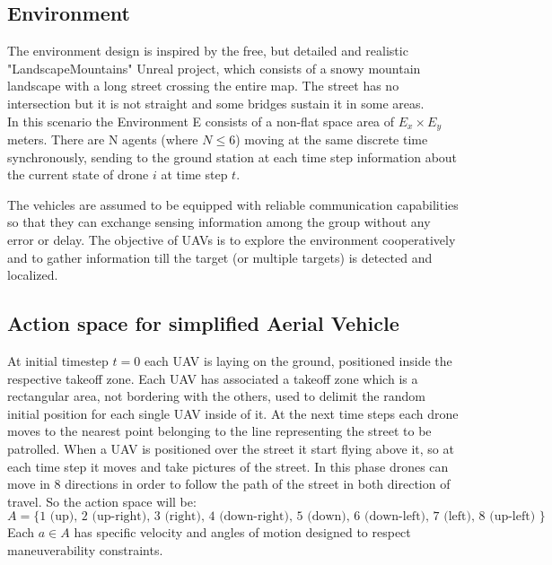 \documentclass[LaM,binding=0.6cm]{sapthesis}
\begin{document}
\subsection*{Environment}
The environment design is inspired by the free, but detailed and realistic "LandscapeMountains" Unreal project, which consists of a snowy mountain landscape with a long street crossing the entire map. The street has no intersection but it is not straight and some bridges sustain it in some areas.\\

In this scenario the Environment E consists of a non-flat space area of $E_x \times E_y$ meters. There are N agents (where $N\le6$) moving at the same discrete time synchronously, sending to the ground station at each time step information about the current state of drone $i$ at time step $t$.


 The vehicles are assumed to be equipped with reliable
communication capabilities so that they can exchange sensing information among the group without any error or delay.
The objective of UAVs is to explore the environment cooperatively and to gather information till the target (or multiple targets) is detected and localized.

\subsection*{Action space for simplified Aerial Vehicle}
At initial timestep $t=0$ each UAV is laying on the ground, positioned inside the respective takeoff zone. Each UAV has associated a takeoff zone which is a rectangular area, not bordering with the others, used to delimit the random initial position for each single UAV inside of it.
At the next time steps each drone moves to the nearest point belonging to the line representing the street to be patrolled.
When a UAV is positioned over the street it start flying above it, so at each time step it moves and take pictures of the street. In this phase drones can move in 8 directions in order to follow the path of the street in both direction of travel. So the action space will be: 
$$ A = \{ 1 \mbox{ (up), }
2 \mbox{ (up-right), }
3 \mbox{ (right), } 
4 \mbox{ (down-right), }
5\mbox{ (down), }
6 \mbox{ (down-left), }
7 \mbox{ (left), } 
8 \mbox{ (up-left) }
\}$$
Each $a \in A$ has specific velocity and angles of motion designed to respect maneuverability constraints.
\end{document}
